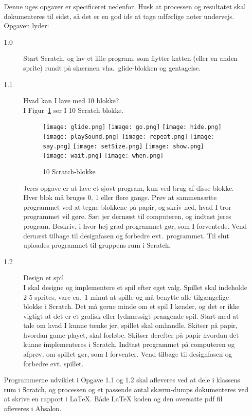 \documentclass[a4paper,12pt]{article}
\begin{document}
Denne uges opgaver er specificeret nedenfor. Husk at processen og resultatet skal dokumenteres til sidst, så det er en god ide at tage udførlige noter undervejs. Opgaven lyder:
\begin{description}
\item[1.0] Start Scratch, og lav et lille program, som flytter katten (eller en anden sprite) rundt på skærmen vha.\ glide-blokken og gentagelse.
\item[1.1] Hvad kan I lave med 10 blokke?\\
  I Figur~\ref{fig:blokke} ser I 10 Scratch blokke.
  \begin{figure}
    \centering
    \texttt{[image: glide.png]}
    \texttt{[image: go.png]}
    \texttt{[image: hide.png]}
    \texttt{[image: playSound.png]}
    \texttt{[image: repeat.png]}
    \texttt{[image: say.png]}
    \texttt{[image: setSize.png]}
    \texttt{[image: show.png]}
    \texttt{[image: wait.png]}
    \texttt{[image: when.png]}
    \caption{10 Scratch-blokke}
    \label{fig:blokke}
  \end{figure}
  Jeres opgave er at lave et sjovt program, kun ved brug af disse blokke. Hver blok må bruges 0, 1 eller flere gange. Prøv at sammensætte programmet ved at tegne blokkene på papir, og skriv ned, hvad I tror programmet vil gøre. Sæt jer dernæst til computeren, og indtast jeres program. Beskriv, i hvor høj grad programmet gør, som I forventede. Vend dernæst tilbage til designfasen og forbedre evt.\ programmet. Til slut uploades programmet til gruppens rum i Scratch.
\item[1.2] Design et spil\\
  I skal designe og implementere et spil efter eget valg. Spillet skal indeholde 2-5 sprites, vare ca.\ 1 minut at spille og må benytte alle tilgængelige blokke i Scratch. Det må gerne minde om et spil I kender, og det er ikke vigtigt at det er et grafisk eller lydmæssigt prangende spil. Start med at tale om hvad I kunne tænke jer, spillet skal omhandle. Skitser på papir, hvordan game-playet, skal forløbe. Skitser derefter på papir hvordan det kunne implementeres i Scratch. Indtast programmet på computeren og afprøv, om spillet gør, som I forventer. Vend tilbage til designfasen og forbedre evt. spillet.
\end{description}
Programmerne udviklet i Opgave 1.1 og 1.2 skal afleveres ved at dele i klassens rum i Scratch, og processen og et passende antal skærm-dumps dokumenteres ved at skrive en rapport i LaTeX. Både LaTeX koden og den oversatte pdf fil afleveres i Absalon.
\end{document}
